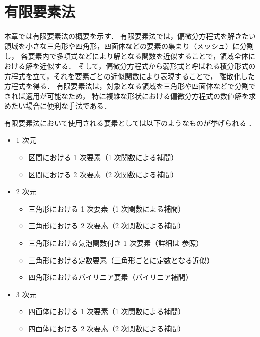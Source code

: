 %

\chapter{有限要素法}\label{chap:pde_fem}

本章では有限要素法の概要を示す．
有限要素法では，偏微分方程式を解きたい領域を小さな三角形や四角形，四面体などの要素の集まり（メッシュ）に分割し，
各要素内で多項式などにより解となる関数を近似することで，領域全体における解を近似する．
そして，偏微分方程式から弱形式と呼ばれる積分形式の方程式を立て，それを要素ごとの近似関数により表現することで，
離散化した方程式を得る．
有限要素法は，対象となる領域を三角形や四面体などで分割できれば適用が可能なため，
特に複雑な形状における偏微分方程式の数値解を求めたい場合に便利な手法である．

有限要素法において使用される要素としては以下のようなものが挙げられる \cite{Tosaka1991,Knabner2003,FreeFEMDoc}．

\begin{itemize}
    \item 1 次元
          \begin{itemize}
              \item 区間における 1 次要素（1 次関数による補間）
              \item 区間における 2 次要素（2 次関数による補間）
          \end{itemize}
    \item 2 次元
          \begin{itemize}
              \item 三角形における 1 次要素（1 次関数による補間）
              \item 三角形における 2 次要素（2 次関数による補間）
              \item 三角形における気泡関数付き 1 次要素（詳細は \cite{Tosaka1991,FreeFEMDoc} 参照）
              \item 三角形における定数要素（三角形ごとに定数となる近似）
              \item 四角形におけるバイリニア要素（バイリニア補間）
          \end{itemize}
    \item 3 次元
          \begin{itemize}
              \item 四面体における 1 次要素（1 次関数による補間）
              \item 四面体における 2 次要素（2 次関数による補間）
          \end{itemize}
\end{itemize}


